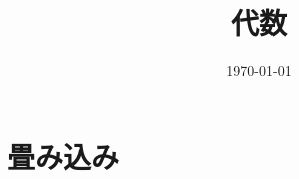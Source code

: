 \documentclass[6pt]{jreport}
\title{代数}
\author{}
\date{\today}
\begin{document}
\maketitle
\tableofcontents

%
%
%
\chapter{畳み込み}




\end{document}
